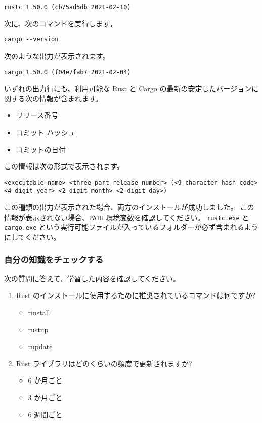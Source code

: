 \begin{lstlisting}[numbers=none]
rustc 1.50.0 (cb75ad5db 2021-02-10)
\end{lstlisting}

次に、次のコマンドを実行します。

\begin{lstlisting}[numbers=none]
cargo --version
\end{lstlisting}

次のような出力が表示されます。

\begin{lstlisting}[numbers=none]
cargo 1.50.0 (f04e7fab7 2021-02-04)
\end{lstlisting}

いずれの出力行にも、利用可能な Rust と Cargo の最新の安定したバージョンに関する次の情報が含まれます。

\begin{itemize}
\item リリース番号
\item コミット ハッシュ
\item コミットの日付
\end{itemize}

この情報は次の形式で表示されます。

\texttt{<executable-name> <three-part-release-number> (<9-character-hash-code> <4-digit-year>-<2-digit-month>-<2-digit-day>)}

この種類の出力が表示された場合、両方のインストールが成功しました。 この情報が表示されない場合、\texttt{PATH} 環境変数を確認してください。 \texttt{rustc.exe} と \texttt{cargo.exe} という実行可能ファイルが入っているフォルダーが必ず含まれるようにしてください。

\subsubsection{自分の知識をチェックする}

次の質問に答えて、学習した内容を確認してください。

\begin{enumerate}
\item Rust のインストールに使用するために推奨されているコマンドは何ですか?

\begin{itemize}
\item rinstall
\item rustup
\item rupdate
\end{itemize}

\item Rust ライブラリはどのくらいの頻度で更新されますか?
\begin{itemize}
\item 6 か月ごと
\item 3 か月ごと
\item 6 週間ごと
\end{itemize}
\end{enumerate}

